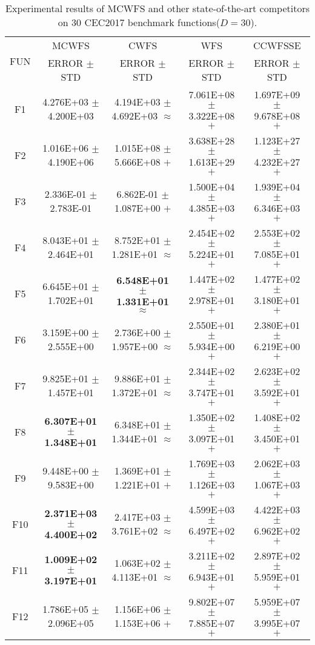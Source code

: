 \documentclass[paper]{ieice}
\begin{document}
\begin{table*}[htbp]  
	\caption{Experimental results of MCWFS and other state-of-the-art competitors on 30 CEC2017 benchmark functions($D = 30$).}  \label{cec2017d30}
	\centering
	\begin{tabular}{c|c|c|c|c}
		\hline
		\multirow{2}{*}{FUN}	&	MCWFS				&	CWFS				&	WFS				&	CCWFSSE				\\   \cline{2-5}
		&	ERROR	$\pm$	STD		&	ERROR	$\pm$	STD		&	ERROR	$\pm$	STD		&	ERROR	$\pm$	STD		\\ \hline
		F1	&	4.276E+03	$\pm$	4.200E+03		&	4.194E+03	$\pm$	4.692E+03	$\approx$	&	7.061E+08	$\pm$	3.322E+08	$+$	&	1.697E+09	$\pm$	9.678E+08	$+$	\\
		F2	&	1.016E+06	$\pm$	4.190E+06		&	1.015E+08	$\pm$	5.666E+08	$+$	&	3.638E+28	$\pm$	1.613E+29	$+$	&	1.123E+27	$\pm$	4.232E+27	$+$	\\
		F3	&	2.336E-01	$\pm$	2.783E-01		&	6.862E-01	$\pm$	1.087E+00	$+$	&	1.500E+04	$\pm$	4.385E+03	$+$	&	1.939E+04	$\pm$	6.346E+03	$+$	\\
		F4	&	8.043E+01	$\pm$	2.464E+01		&	8.752E+01	$\pm$	1.281E+01	$\approx$	&	2.454E+02	$\pm$	5.224E+01	$+$	&	2.553E+02	$\pm$	7.085E+01	$+$	\\
		F5	&	6.645E+01	$\pm$	1.702E+01		&	\textbf{6.548E+01	$\pm$	1.331E+01}	$\approx$	&	1.447E+02	$\pm$	2.978E+01	$+$	&	1.477E+02	$\pm$	3.180E+01	$+$	\\
		F6	&	3.159E+00	$\pm$	2.555E+00		&	2.736E+00	$\pm$	1.957E+00	$\approx$	&	2.550E+01	$\pm$	5.934E+00	$+$	&	2.380E+01	$\pm$	6.219E+00	$+$	\\
		F7	&	9.825E+01	$\pm$	1.457E+01		&	9.886E+01	$\pm$	1.372E+01	$\approx$	&	2.344E+02	$\pm$	3.747E+01	$+$	&	2.623E+02	$\pm$	3.592E+01	$+$	\\
		F8	&	\textbf{6.307E+01	$\pm$	1.348E+01}		&	6.348E+01	$\pm$	1.344E+01	$\approx$	&	1.350E+02	$\pm$	3.097E+01	$+$	&	1.408E+02	$\pm$	3.450E+01	$+$	\\
		F9	&	9.448E+00	$\pm$	9.583E+00		&	1.369E+01	$\pm$	1.221E+01	$+$	&	1.769E+03	$\pm$	1.126E+03	$+$	&	2.062E+03	$\pm$	1.067E+03	$+$	\\
		F10	&	\textbf{2.371E+03	$\pm$	4.400E+02}		&	2.417E+03	$\pm$	3.761E+02	$\approx$	&	4.599E+03	$\pm$	6.497E+02	$+$	&	4.422E+03	$\pm$	6.962E+02	$+$	\\
		F11	&	\textbf{1.009E+02	$\pm$	3.197E+01}		&	1.063E+02	$\pm$	4.113E+01	$\approx$	&	3.211E+02	$\pm$	6.943E+01	$+$	&	2.897E+02	$\pm$	5.959E+01	$+$	\\
		F12	&	1.786E+05	$\pm$	2.096E+05		&	1.156E+06	$\pm$	1.153E+06	$+$	&	9.802E+07	$\pm$	7.885E+07	$+$	&	5.959E+07	$\pm$	3.995E+07	$+$	\\

\end{tabular}
\end{table*}
\end{document}
